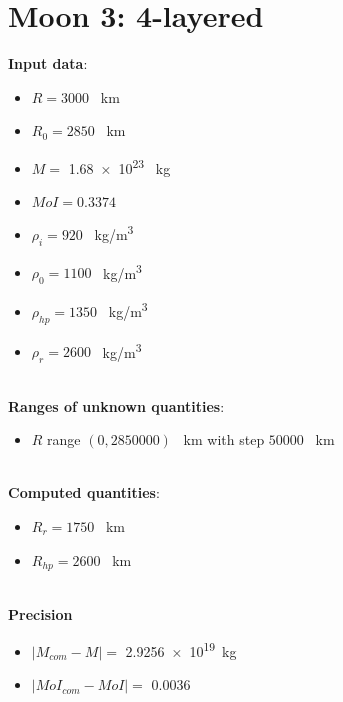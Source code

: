 \documentclass{article}
\begin{document}
\section*{Moon 3: 4-layered}
\textbf{Input data}:
\begin{itemize}
    \item $R = 3000$ \SI{}{km}
    \item $R_0 = 2850$ \SI{}{km}
    \item $M =$ \num{1.68e23} \SI{}{kg}
    \item $MoI = 0.3374$
    \item $\rho_i = 920$ \SI{}{kg/m^3}
    \item $\rho_0 = 1100$ \SI{}{kg/m^3}
    \item $\rho_{hp} = 1350$ \SI{}{kg/m^3}
    \item $\rho_r = 2600$ \SI{}{kg/m^3}
\end{itemize}
\\
\textbf{Ranges of unknown quantities}:
\begin{itemize}
    \item $R$ range $(0,2850000)$ \SI{}{km} with step $50000$ \SI{}{km}
\end{itemize}
\\
\textbf{Computed quantities}:
    \begin{itemize}
        \item $R_r = 1750$ \SI{}{km}
        \item $R_{hp} = 2600$ \SI{}{km}
    \end{itemize}  
\\
\textbf{Precision}
\begin{itemize}
    \item $|M_{com}-M| =$ \num{2.9256e+19}\SI{}{kg}
    \item $|MoI_{com}-MoI| =$ \num{0.0036}
\end{itemize}


\end{document}
